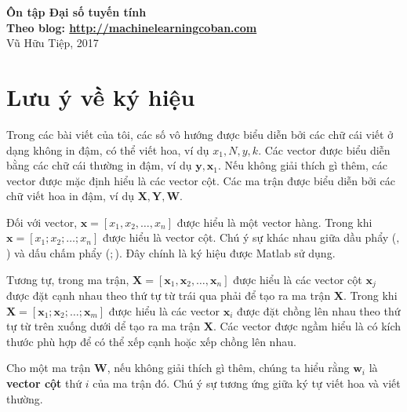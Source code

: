 \documentclass[12pt]{article}
\begin{document}
 \begin{center}
  \textbf{\Huge Ôn tập Đại số tuyến tính}\\ 
  \vspace{.25cm}
\small{\bf Theo blog: \url{http://machinelearningcoban.com}
}\\
\vspace{.5cm}
  Vũ Hữu Tiệp, 2017
\end{center}

 
 

\section{Lưu ý về ký hiệu}
 
Trong các bài viết của tôi, các số vô hướng được biểu diễn bởi các chữ cái viết ở dạng không in đậm, có thể viết hoa, ví dụ $x_1, N, y, k$. Các vector được biểu diễn bằng các chữ cái thường in đậm, ví dụ $\mathbf{y}, \mathbf{x}_1 $. Nếu không giải thích gì thêm, các vector được mặc định hiểu là các vector cột. Các ma trận được biểu diễn bởi các chữ viết hoa in đậm, ví dụ $\mathbf{X, Y, W} $. 
 
Đối với vector, $\mathbf{x} = [x_1, x_2, \dots, x_n]$ được hiểu là một vector hàng. Trong khi $\mathbf{x} = [x_1; x_2; \dots; x_n] $ được hiểu là vector cột. Chú ý sự khác nhau giữa dầu phẩy ($,$) và dấu chấm phẩy ($;$). Đây chính là ký hiệu được Matlab sử dụng. 
 
Tương tự, trong ma trận, $\mathbf{X} = [\mathbf{x}_1, \mathbf{x}_2, \dots, \mathbf{x}_n]$ được hiểu là các vector cột $\mathbf{x}_j$ được đặt cạnh nhau theo thứ tự từ trái qua phải để tạo ra ma trận $\mathbf{X}$. Trong khi $\mathbf{X} = [\mathbf{x}_1; \mathbf{x}_2; \dots; \mathbf{x}_m]$ được hiểu là các vector $\mathbf{x}_i$ được đặt chồng lên nhau theo thứ tự từ trên xuống dưới dể tạo ra ma trận $\mathbf{X}$. Các vector được ngầm hiểu là có kích thước phù hợp để có thể xếp cạnh hoặc xếp chồng lên nhau. 
 
Cho một ma trận $\mathbf{W}$, nếu không giải thích gì thêm, chúng ta hiểu rằng $\mathbf{w}_i$ là \textbf{vector cột} thứ $i$ của ma trận đó. Chú ý sự tương ứng giữa ký tự viết hoa và viết thường. 
 
\end{document}
